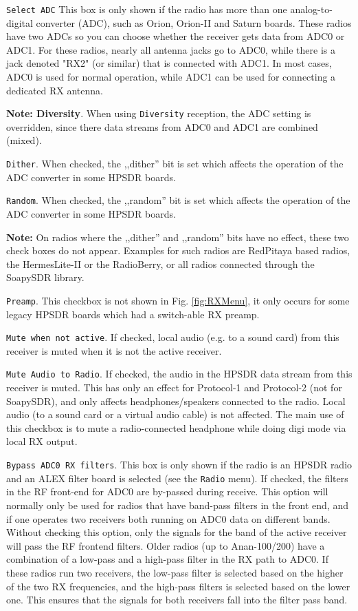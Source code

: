 \documentclass[12pt]{book}
\def\rett#1{\texttt{\color{red}#1}}
\def\bltt#1{\texttt{\color{blue}#1}}
\begin{document}
\rett{Select ADC} This box is only shown if the radio has more than one analog-to-digital
converter (ADC), such as Orion, Orion-II and Saturn boards. These radios have two ADCs so
you can choose whether the receiver gets data from ADC0 or ADC1. For these radios, nearly
all antenna jacks go to ADC0, while there is a jack denoted "RX2" (or similar) that
is connected with ADC1. In most cases, ADC0 is used for normal operation, while ADC1
can be used for connecting a dedicated RX antenna.

\textbf{Note: Diversity}. When using \bltt{Diversity} reception, the ADC setting is
overridden, since there data streams from ADC0 and ADC1 are combined (mixed).

\rett{Dither}. When checked, the ,,dither'' bit is set which affects the operation of
the ADC converter in some HPSDR boards.

\rett{Random}. When checked, the ,,random'' bit is set which affects the operation of
the ADC converter in some HPSDR boards.

\textbf{Note:} On radios where the ,,dither'' and ,,random'' bits have no effect, these
two check boxes do not appear. Examples for such radios are RedPitaya based radios,
the HermesLite-II or the RadioBerry, or all radios connected through the SoapySDR
library.

\rett{Preamp}. This checkbox is not shown in Fig. \ref{fig:RXMenu}, it only occurs
for some legacy HPSDR boards which had a switch-able RX preamp.

\rett{Mute when not active}. If checked, local audio (e.g. to a sound card)
from this receiver is muted when
it is not the active receiver.

\rett{Mute Audio to Radio}. If checked, the audio in the HPSDR data stream from this receiver is muted.
This has only an effect for Protocol-1 and Protocol-2 (not for SoapySDR), and only affects headphones/speakers
connected to the radio. Local audio (to a sound card or a virtual audio cable)
is not affected. The main use of this checkbox is
to mute a radio-connected headphone while doing digi mode via local RX output.

\rett{Bypass ADC0 RX filters}. This box is only shown if the radio is an HPSDR radio
and an ALEX filter board
is selected (see the \bltt{Radio} menu). If checked, the filters in the RF front-end for ADC0
are by-passed during receive. This option will normally only be used for radios that
have band-pass filters in the front end, and if one operates two receivers both running
on ADC0 data on different bands. Without checking this option, only the signals for
the band of the active receiver will pass the RF frontend filters.
Older radios (up to Anan-100/200)  have a
combination of a low-pass and a high-pass filter in the RX path to ADC0. If these
radios run two receivers, the low-pass filter is selected based on the higher
of the two RX frequencies, and the high-pass filters is selected based on the
lower one. This ensures that the signals for both receivers fall into  the filter
pass band.
\end{document}
